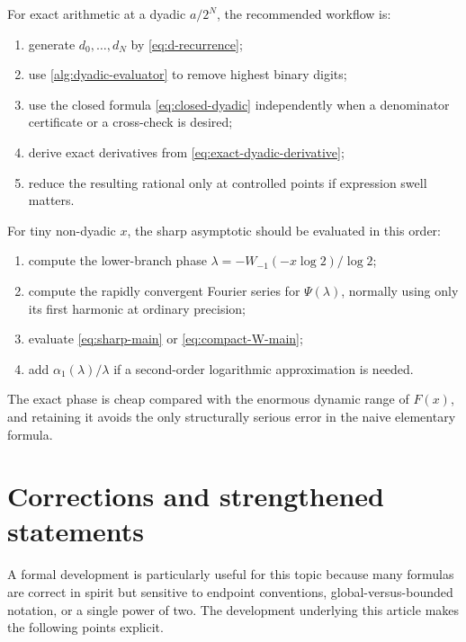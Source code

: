 \documentclass[11pt,oneside]{article}
\theoremstyle{definition}
\theoremstyle{remark}
\newcommand{\Lam}{\lambda}
\newcommand{\PsiPer}{\Psi}
\begin{document}
For exact arithmetic at a dyadic $a/2^N$, the recommended workflow is:
\begin{enumerate}
\item generate $d_0,\ldots,d_N$ by \eqref{eq:d-recurrence};
\item use \cref{alg:dyadic-evaluator} to remove highest binary digits;
\item use the closed formula \eqref{eq:closed-dyadic} independently when a
      denominator certificate or a cross-check is desired;
\item derive exact derivatives from \eqref{eq:exact-dyadic-derivative};
\item reduce the resulting rational only at controlled points if expression swell
      matters.
\end{enumerate}
For tiny non-dyadic $x$, the sharp asymptotic should be evaluated in this order:
\begin{enumerate}
\item compute the lower-branch phase $\Lam=-W_{-1}(-x\log2)/\log2$;
\item compute the rapidly convergent Fourier series for $\PsiPer(\Lam)$, normally
      using only its first harmonic at ordinary precision;
\item evaluate \eqref{eq:sharp-main} or \eqref{eq:compact-W-main};
\item add $\alpha_1(\Lam)/\Lam$ if a second-order logarithmic approximation is
      needed.
\end{enumerate}
The exact phase is cheap compared with the enormous dynamic range of $F(x)$, and
retaining it avoids the only structurally serious error in the naive elementary
formula.

\section{Corrections and strengthened statements}\label{sec:corrections}

A formal development is particularly useful for this topic because many formulas
are correct in spirit but sensitive to endpoint conventions, global-versus-bounded
notation, or a single power of two.  The development underlying this article makes
the following points explicit.
\end{document}
